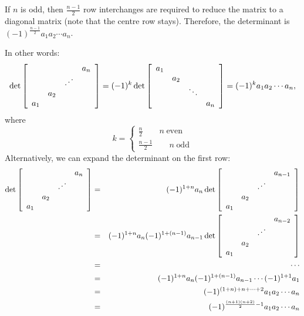 If $n$ is odd, then $\frac{n-1}{2}$ row interchanges are required to reduce the matrix to a diagonal matrix (note that the centre row stays). Therefore, the determinant is $(-1)^{\frac{n-1}{2}}a_1a_2\cdots a_n$.

In other words:
$$
\det\left[\begin{array}{cccc}&&&a_n\\&&\rdots\\&a_2\\a_1\end{array}\right]=
(-1)^k\det\left[\begin{array}{cccc}a_1\\&a_2\\&&\ddots\\&&&a_n\end{array}\right]=
(-1)^ka_1a_2\cdots a_n,
$$
where
$$
k=\left\{\begin{array}{c}\frac{n}{2}\qquad n\hspace{3pt}\textrm{even}\\\frac{n-1}{2}\qquad n\hspace{3pt}\textrm{odd}\end{array}\right.
$$
Alternatively, we can expand the determinant on the first row:
\begin{eqnarray*}
\det\left[\begin{array}{cccc}&&&a_n\\&&\rdots\\&a_2\\a_1\end{array}\right]&=&
(-1)^{1+n}a_n
\det\left[\begin{array}{cccc}&&&a_{n-1}\\&&\rdots\\&a_2\\a_1\end{array}\right]\\
&=&(-1)^{1+n}a_n(-1)^{1+(n-1)}a_{n-1}
\det\left[\begin{array}{cccc}&&&a_{n-2}\\&&\rdots\\&a_2\\a_1\end{array}\right]\\
&=&\cdots\\
&=&(-1)^{1+n}a_n(-1)^{1+(n-1)}a_{n-1}\cdots(-1)^{1+1}a_1\\
&=&(-1)^{(1+n)+n+\cdots+2}a_1a_2\cdots a_n\\
&=&(-1)^{\frac{(n+1)(n+2)}{2}-1}a_1a_2\cdots a_n
\end{eqnarray*}

